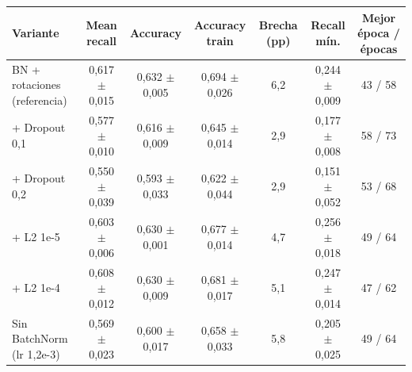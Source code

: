 \begin{tabular}{lcccccc}
\toprule
Variante & Mean recall & Accuracy & Accuracy train & Brecha (pp) & Recall mín. & Mejor época / épocas \\
\midrule
BN + rotaciones (referencia) & 0,617 $\pm$ 0,015 & 0,632 $\pm$ 0,005 & 0,694 $\pm$ 0,026 & 6,2 & 0,244 $\pm$ 0,009 & 43 / 58 \\
+ Dropout 0,1 & 0,577 $\pm$ 0,010 & 0,616 $\pm$ 0,009 & 0,645 $\pm$ 0,014 & 2,9 & 0,177 $\pm$ 0,008 & 58 / 73 \\
+ Dropout 0,2 & 0,550 $\pm$ 0,039 & 0,593 $\pm$ 0,033 & 0,622 $\pm$ 0,044 & 2,9 & 0,151 $\pm$ 0,052 & 53 / 68 \\
+ L2 1e-5 & 0,603 $\pm$ 0,006 & 0,630 $\pm$ 0,001 & 0,677 $\pm$ 0,014 & 4,7 & 0,256 $\pm$ 0,018 & 49 / 64 \\
+ L2 1e-4 & 0,608 $\pm$ 0,012 & 0,630 $\pm$ 0,009 & 0,681 $\pm$ 0,017 & 5,1 & 0,247 $\pm$ 0,014 & 47 / 62 \\
Sin BatchNorm (lr 1,2e-3) & 0,569 $\pm$ 0,023 & 0,600 $\pm$ 0,017 & 0,658 $\pm$ 0,033 & 5,8 & 0,205 $\pm$ 0,025 & 49 / 64 \\
\bottomrule
\end{tabular}
